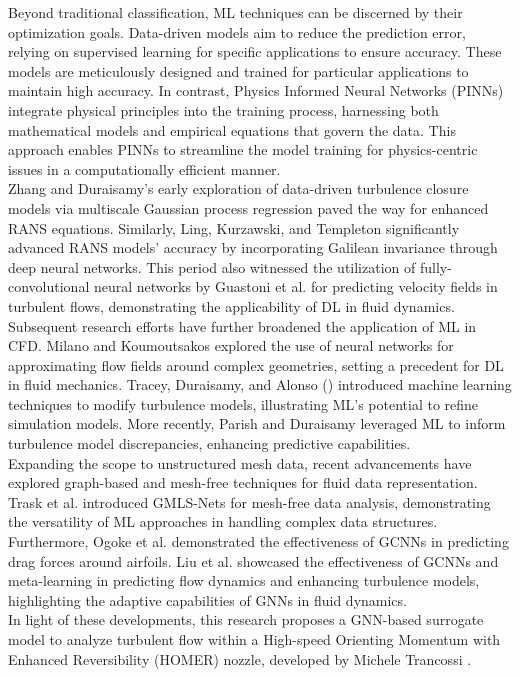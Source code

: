 Beyond traditional classification, ML techniques can be discerned by their optimization goals. Data-driven models aim to reduce the prediction error, relying on supervised learning for specific applications to ensure accuracy. These models are meticulously designed and trained for particular applications to maintain high accuracy. In contrast, Physics Informed Neural Networks (PINNs) \cite{raissi2019physics} integrate physical principles into the training process, harnessing both mathematical models and empirical equations that govern the data. This approach enables PINNs to streamline the model training for physics-centric issues in a computationally efficient manner. \\
Zhang and Duraisamy’s early exploration \cite{zhang2015} of data-driven turbulence closure models via multiscale Gaussian process regression paved the way for enhanced RANS equations. Similarly, Ling, Kurzawski, and Templeton \cite{ling2016} significantly advanced RANS models' accuracy by incorporating Galilean invariance through deep neural networks. This period also witnessed the utilization of fully-convolutional neural networks by Guastoni et al. \cite{guastoni2020} for predicting velocity fields in turbulent flows, demonstrating the applicability of DL in fluid dynamics.\\
Subsequent research efforts have further broadened the application of ML in CFD. Milano and Koumoutsakos \cite{milano2002} explored the use of neural networks for approximating flow fields around complex geometries, setting a precedent for DL in fluid mechanics. Tracey, Duraisamy, and Alonso (\cite{tracey2013}) introduced machine learning techniques to modify turbulence models, illustrating ML's potential to refine simulation models. More recently, Parish and Duraisamy \cite{parish2016} leveraged ML to inform turbulence model discrepancies, enhancing predictive capabilities.\\
Expanding the scope to unstructured mesh data, recent advancements have explored graph-based and mesh-free techniques for fluid data representation. Trask et al. \cite{trask2019} introduced GMLS-Nets for mesh-free data analysis, demonstrating the versatility of ML approaches in handling complex data structures. Furthermore, Ogoke et al. \cite{ogoke2020} demonstrated the effectiveness of GCNNs in predicting drag forces around airfoils. Liu et al. \cite{metalearning} showcased the effectiveness of GCNNs and meta-learning in predicting flow dynamics and enhancing turbulence models, highlighting the adaptive capabilities of GNNs in fluid dynamics.\\
In light of these developments, this research proposes a GNN-based surrogate model to analyze turbulent flow within a High-speed Orienting Momentum with Enhanced Reversibility (HOMER) nozzle, developed by Michele Trancossi \cite{trandum}.

